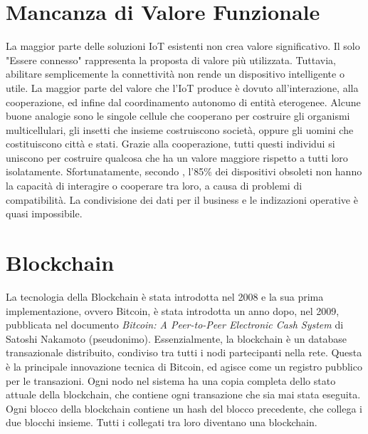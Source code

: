 \documentclass[a4paper,12pt,draft]{article}
\begin{document}
\section{Mancanza di Valore Funzionale}
La maggior parte delle soluzioni IoT esistenti non crea valore significativo. Il solo "Essere connesso" rappresenta la proposta di valore più utilizzata. Tuttavia, abilitare semplicemente la connettività non rende un dispositivo intelligente o utile. La maggior parte del valore che l'IoT produce è dovuto all'interazione, alla cooperazione, ed infine dal coordinamento autonomo di entità eterogenee. Alcune buone analogie sono le singole cellule che cooperano per costruire gli organismi multicellulari, gli insetti che insieme costruiscono società, oppure gli uomini che costituiscono città e stati. Grazie alla cooperazione, tutti questi individui si uniscono per costruire qualcosa che ha un valore maggiore rispetto a tutti loro isolatamente. Sfortunatamente, secondo \cite{29}, l'85\% dei dispositivi obsoleti non hanno la capacità di interagire o cooperare tra loro, a causa di problemi di compatibilità. La condivisione dei dati per il business e le indizazioni operative è quasi impossibile.

\section{Blockchain}
La tecnologia della Blockchain è stata introdotta nel 2008 e la sua prima implementazione, ovvero Bitcoin, è stata introdotta un anno dopo, nel 2009, pubblicata nel documento \emph{Bitcoin: A Peer-to-Peer Electronic Cash System} \cite{21} di Satoshi Nakamoto (pseudonimo). Essenzialmente, la blockchain è un database transazionale distribuito, condiviso tra tutti i nodi partecipanti nella rete. Questa è la principale innovazione tecnica di Bitcoin, ed agisce come un registro pubblico per le transazioni. Ogni nodo nel sistema ha una copia completa dello stato attuale della blockchain, che contiene ogni transazione che sia mai stata eseguita. Ogni blocco della blockchain contiene un hash del blocco precedente, che collega i due blocchi insieme. Tutti i collegati tra loro diventano una blockchain.



\pagebreak




\end{document}
